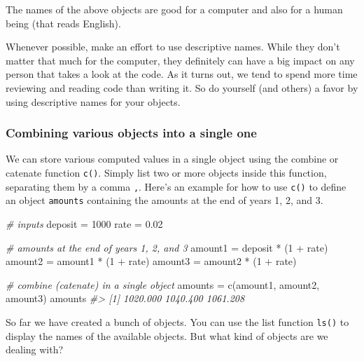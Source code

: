 \documentclass[
]{book}
\newenvironment{Shaded}{\begin{snugshade}}{\end{snugshade}}
\newcommand{\CommentTok}[1]{\textcolor[rgb]{0.56,0.35,0.01}{\textit{#1}}}
\newcommand{\DecValTok}[1]{\textcolor[rgb]{0.00,0.00,0.81}{#1}}
\newcommand{\FloatTok}[1]{\textcolor[rgb]{0.00,0.00,0.81}{#1}}
\newcommand{\FunctionTok}[1]{\textcolor[rgb]{0.00,0.00,0.00}{#1}}
\newcommand{\NormalTok}[1]{#1}
\newcommand{\OtherTok}[1]{\textcolor[rgb]{0.56,0.35,0.01}{#1}}
\newcommand{\SpecialCharTok}[1]{\textcolor[rgb]{0.00,0.00,0.00}{#1}}
\begin{document}
The names of the above objects are good for a computer and also for a human
being (that reads English).

Whenever possible, make an effort to use descriptive names. While they don't
matter that much for the computer, they definitely can have a big impact on
any person that takes a look at the code. As it turns out, we tend to spend
more time reviewing and reading code than writing it. So do yourself
(and others) a favor by using descriptive names for your objects.

\hypertarget{combining-various-objects-into-a-single-one}{%
\subsubsection*{Combining various objects into a single one}\label{combining-various-objects-into-a-single-one}}

We can store various computed values in a single object using the combine or
catenate function \texttt{c()}. Simply list two or more objects inside this function,
separating them by a comma \texttt{,}. Here's an example for how to use \texttt{c()} to
define an object \texttt{amounts} containing the amounts at the end of years 1, 2,
and 3.

\begin{Shaded}
\begin{Highlighting}[]
\CommentTok{\# inputs}
\NormalTok{deposit }\OtherTok{=} \DecValTok{1000}
\NormalTok{rate }\OtherTok{=} \FloatTok{0.02}

\CommentTok{\# amounts at the end of years 1, 2, and 3}
\NormalTok{amount1 }\OtherTok{=}\NormalTok{ deposit }\SpecialCharTok{*}\NormalTok{ (}\DecValTok{1} \SpecialCharTok{+}\NormalTok{ rate)}
\NormalTok{amount2 }\OtherTok{=}\NormalTok{ amount1 }\SpecialCharTok{*}\NormalTok{ (}\DecValTok{1} \SpecialCharTok{+}\NormalTok{ rate)}
\NormalTok{amount3 }\OtherTok{=}\NormalTok{ amount2 }\SpecialCharTok{*}\NormalTok{ (}\DecValTok{1} \SpecialCharTok{+}\NormalTok{ rate)}

\CommentTok{\# combine (catenate) in a single object}
\NormalTok{amounts }\OtherTok{=} \FunctionTok{c}\NormalTok{(amount1, amount2, amount3)}
\NormalTok{amounts}
\CommentTok{\#\textgreater{} [1] 1020.000 1040.400 1061.208}
\end{Highlighting}
\end{Shaded}

So far we have created a bunch of objects. You can use the list function \texttt{ls()}
to display the names of the available objects. But what kind of objects are we
dealing with?
\end{document}
